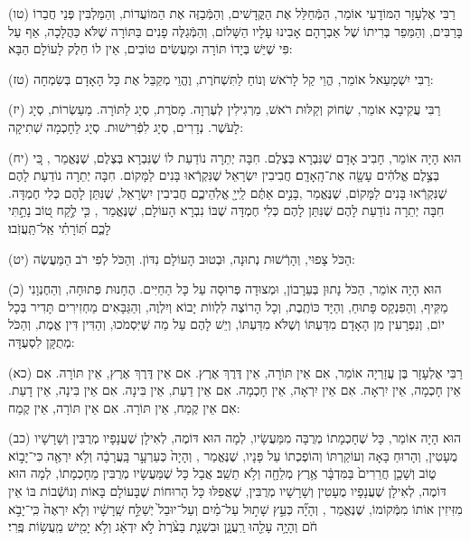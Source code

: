 \documentclass[twoside, openany, parskip=half, 11pt]{book}
\begin{document}
(טו)
רַבִּי אֶלְעָזָר הַמּוֹדָעִי אוֹמֵר, הַמְּֿחַלֵּל אֶת הַקֳּדָשִׁים, וְהַמְּֿבַזֶּה אֶת הַמּוֹעֲדוֹת, וְהַמַּלְבִּין פְּנֵי חֲבֵרוֹ בָּרַבִּים, וְהַמֵּפֵר בְּרִיתוֹ שֶׁל אַבְרָהָם אָבִינוּ עָלָיו הַשָּׁלוֹם, וְהַמְּֿגַלֶּה פָנִים בַּתּוֹרָה שֶׁלֹּא כַּהֲלָכָה, אַף עַל פִּי שֶׁיֵּשׁ בְּיָדוֹ תּוֹרָה וּמַעֲשִׂים טוֹבִים, אֵין לוֹ חֵלֶק לָעוֹלָם הַבָּא:

(טז)
רַבִּי יִשְׁמָעֵאל אוֹמֵר, הֱוֵי קַל לָרֹאשׁ וְנוֹחַ לַתִּשְׁחֹרֶת, וֶהֱוֵי מְקַבֵּל אֶת כָּל הָאָדָם בְּשִׂמְחָה:

(יז)
רַבִּי עֲקִיבָא אוֹמֵר, שְׂחוֹק וְקַלּוּת רֹאשׁ, מֵרְגִילִין לְעֶרְוָה.
מָסֹרֶת, סְיָג לַתּוֹרָה.
מַעַשְׂרוֹת, סְיָג לָעֹשֶׁר.
נְדָרִים, סְיָג לִפְֿרִישׁוּת.
סְיָג לַחָכְמָה שְׁתִיקָה:

(יח)
הוּא הָיָה אוֹמֵר, חָבִיב אָדָם שֶׁנִּבְרָא בְּצֶלֶם.
חִבָּה יְתֵרָה נוֹדַעַת לוֹ שֶׁנִּבְרָא בְּצֶלֶם, שֶׁנֶּאֱמַר 
, כִּ֚י בְּצֶ֣לֶם אֱלֹהִ֔ים עָשָׂ֖ה אֶת־הָֽאָדָֽם׃
חֲבִיבִין יִשְׂרָאֵל שֶׁנִּקְרְֿאוּ בָּנִים לַמָּקוֹם.
חִבָּה יְתֵרָה נוֹדַעַת לָהֶם שֶׁנִּקְרְֿאוּ בָּנִים לַמָּקוֹם, שֶׁנֶּאֱמַר 
,בָּנִ֣ים אַתֶּ֔ם לַֽייָ֖ אֱלֹֽהֵיכֶ֑ם
חֲבִיבִין יִשְׂרָאֵל, שֶׁנִּתַּן לָהֶם כְּלִי חֶמְדָּה.
חִבָּה יְתֵרָה נוֹדַעַת לָהֶם שֶׁנִּתַּן לָהֶם כְּלִי חֶמְדָּה שֶׁבּוֹ נִבְרָא הָעוֹלָם, שֶׁנֶּאֱמַר 
, כִּ֤י לֶ֣קַח ט֭וֹב נָתַ֣תִּי לָכֶ֑ם תּֽ֝וֹרָתִ֗י אַֽל־תַּֽעֲזֹֽבוּ׃

(יט)
הַכֹּל צָפוּי, וְהָרְֿשׁוּת נְתוּנָה, וּבְטוּב הָעוֹלָם נִדּוֹן.
וְהַכֹּל לְפִי רֹב הַמַּעֲשֶׂה:

(כ)
הוּא הָיָה אוֹמֵר, הַכֹּל נָתוּן בְּעֵרָבוֹן, וּמְצוּדָה פְּרוּסָה עַל כָּל הַחַיִּים.
הֶחָנוּת פְּתוּחָה, וְהַחֶנְוָנִי מַקִּיף, וְהַפִּנְקֵס פָּתוּחַ, וְהַיָּד כּוֹתֶֽבֶת, וְכָל הָרוֹצֶה לִלְווֹת יָבוֹא וְיִלְוֶה, וְהַגַּבָּאִים מַחְזִירִים תָּדִיר בְּכָל יוֹם, וְנִפְרָעִין מִן הָאָדָם מִדַּעְתּוֹ וְשֶׁלֹּא מִדַּעְתּוֹ, וְיֵשׁ לָהֶם עַל מַה שֶּׁיִּסְמֹכוּ, וְהַדִּין דִּין אֱמֶת, וְהַכֹּל מְתֻקָּן לִסְעֻדָּה:

(כא)
רַבִּי אֶלְעָזָר בֶּן עֲזַרְיָה אוֹמֵר, אִם אֵין תּוֹרָה, אֵין דֶּרֶךְ אֶרֶץ.
אִם אֵין דֶּרֶךְ אֶרֶץ, אֵין תּוֹרָה.
אִם אֵין חָכְמָה, אֵין יִרְאָה.
אִם אֵין יִרְאָה, אֵין חָכְמָה.
אִם אֵין דַעַת, אֵין בִּינָה.
אִם אֵין בִּינָה, אֵין דָעַת.
אִם אֵין קֶמַח, אֵין תּוֹרָה.
אִם אֵין תּוֹרָה, אֵין קֶמַח:

(כב)
הוּא הָיָה אוֹמֵר, כָּל שֶׁחָכְמָתוֹ מְרֻבָּה מִמַּעֲשָׂיו, לְמָה הוּא דּוֹמֶה, לְאִילָן שֶׁעֲנָפָיו מְרֻבִּין וְשָׁרָשָׁיו מֻעָטִין, וְהָרוּחַ בָּאָה וְעוֹקַרְתּוֹ וְהוֹפְכְתוֹ עַל פָּנָיו, שֶׁנֶּאֱמַר 
, וְהָיָה֙ כְּעַרְעָ֣ר בָּֽעֲרָבָ֔ה וְלֹ֥א יִרְאֶ֖ה כִּי־יָב֣וֹא ט֑וֹב וְשָׁכַ֤ן חֲרֵרִים֙ בַּמִּדְבָּ֔ר אֶ֥רֶץ מְלֵחָ֖ה וְלֹ֥א תֵשֵֽׁב׃
אֲבָל כָּל שֶׁמַּעֲשָׂיו מְרֻבִּין מֵחָכְמָתוֹ, לְמָה הוּא דּוֹמֶה, לְאִילָן שֶׁעֲנָפָיו מֻעָטִין וְשָׁרָשָׁיו מְרֻבִּין, שֶׁאֲפִלּוּ כָּל הָרוּחוֹת שֶׁבָּעוֹלָם בָּאוֹת וְנוֹשְֿׁבוֹת בּוֹ אֵין מִזִּיזִין אוֹתוֹ מִמְּֿקוֹמוֹ, שֶׁנֶּאֱמַר 
, וְהָיָ֞ה כְּעֵ֣ץ   שָׁת֣וּל עַל־מַ֗יִם וְעַל־יוּבַל֙ יְשַׁלַּ֣ח שָֽׁרָשָׁ֔יו וְלֹ֤א יִרְאֶה֙ כִּֽי־יָבֹ֣א חֹ֔ם וְהָיָ֥ה עָלֵ֖הוּ רַֽעֲנָ֑ן וּבִשְׁנַ֤ת בַּצֹּ֨רֶת֙ לֹ֣א יִדְאָ֔ג וְלֹ֥א יָמִ֖ישׁ מֵֽעֲשׂ֥וֹת פֶּֽרִי׃
\end{document}
